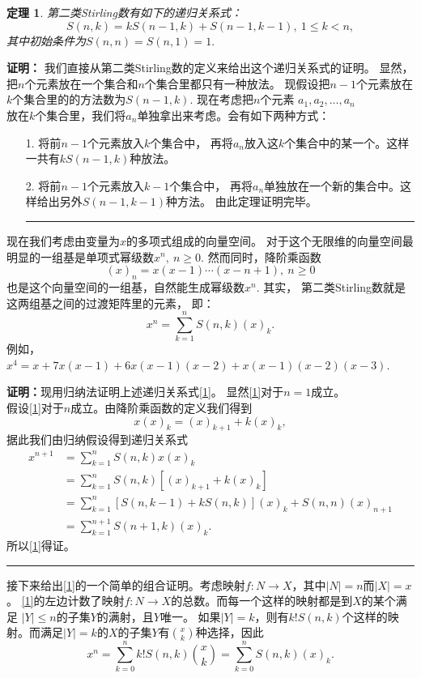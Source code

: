 \documentclass[a4paper,11pt]{article}
\newtheorem{thm}{定理}[section]
\def\qed{\nopagebreak\hfill{\rule{4pt}{7pt}}\medbreak}
\begin{document}
\begin{thm}
第二类Stirling数有如下的递归关系式：
\begin{equation}S(n,k)=kS(n-1,k)+S(n-1,k-1),\ 1\le k<n,\end{equation}
其中初始条件为$S(n,n)=S(n,1)=1.$
\end{thm}
{\bf 证明：}
我们直接从第二类Stirling数的定义来给出这个递归关系式的证明。
显然，把$n$个元素放在一个集合和$n$个集合里都只有一种放法。
现假设把$n-1$个元素放在$k$个集合里的的方法数为$S(n-1,k).$
现在考虑把$n$个元素 $a_1, a_2, \ldots,
a_n$\\放在$k$个集合里，我们将$a_n$单独拿出来考虑。会有如下两种方式：
\begin{itemize}
\item[1. ]将前$n-1$个元素放入$k$个集合中，
再将$a_n$放入这$k$个集合中的某一个。这样一共有$kS(n-1,k)$种放法。
\item[2. ]将前$n-1$个元素放入$k-1$个集合中，
再将$a_n$单独放在一个新的集合中。这样给出另外$S(n-1,k-1)$种方法。
由此定理证明完毕。\qed
\end{itemize}

现在我们考虑由变量为$x$的多项式组成的向量空间。
对于这个无限维的向量空间最明显的一组基是单项式幂级数$x^n,\  n\geq
0.$ 然而同时，降阶乘函数
$$(x)_n=x(x-1)\cdots(x-n+1),\ n\geq 0$$
也是这个向量空间的一组基，自然能生成幂级数$x^n.$ 其实，
第二类Stirling数就是这两组基之间的过渡矩阵里的元素， 即：
\begin{equation}
x^n=\sum_{k=1}^nS(n,k)(x)_k.\label{1}
\end{equation}
例如，$x^4=x+7x(x-1)+6x(x-1)(x-2)+x(x-1)(x-2)(x-3)$.

{\bf 证明：}现用归纳法证明上述递归关系式\ref{1}。
显然\ref{1}对于$n=1$成立。 \\
假设\ref{1}对于$n$成立。由降阶乘函数的定义我们得到
$$x(x)_k=(x)_{k+1}+k(x)_k,$$
据此我们由归纳假设得到递归关系式
\begin{align*}
x^{n+1}&=\sum_{k=1}^nS(n,k)x(x)_k\\
&=\sum_{k=1}^n S(n,k)[(x)_{k+1}+k(x)_k]\\
&=\sum_{k=1}^{n}[S(n,k-1)+kS(n,k)](x)_k+S(n,n)(x)_{n+1}\\
&=\sum_{k=1}^{n+1}S(n+1,k)(x)_k.
\end{align*}
所以\ref{1}得证。\qed

接下来给出\ref{1}的一个简单的组合证明。考虑映射$f:N\rightarrow
X$，其中$|N|=n$而$|X|=x$。 \ref{1}的左边计数了映射$f:N\rightarrow
X$的总数。而每一个这样的映射都是到$X$的某个满足 $|Y|\leq
n$的子集$Y$的满射，且$Y$唯一。
如果$|Y|=k$，则有$k!S(n,k)$个这样的映射。而满足$|Y|=k$的$X$的子集$Y$有${x\choose
k}$种选择，因此
$$x^n=\sum_{k=0}^nk!S(n,k){x\choose k}=\sum_{k=0}^nS(n,k)(x)_k.$$
\end{document}
